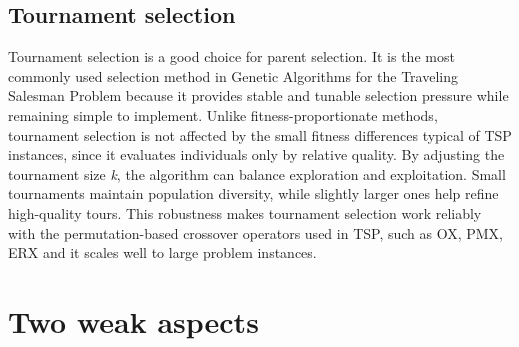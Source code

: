 \documentclass[a4paper,10pt]{article}
\newcommand{\ReplaceMe}[1]{{\color{blue}#1}}
\begin{document}

\subsection{Tournament selection}
Tournament selection is a good choice for parent selection. It is the most commonly used selection method in Genetic Algorithms for the Traveling Salesman Problem because it provides stable and tunable selection pressure while remaining simple to implement. Unlike fitness-proportionate methods, tournament selection is not affected by the small fitness differences typical of TSP instances, since it evaluates individuals only by relative quality. By adjusting the tournament size \textit{k}, the algorithm can balance exploration and exploitation. Small tournaments maintain population diversity, while slightly larger ones help refine high-quality tours. This robustness makes tournament selection work reliably with the permutation-based crossover operators used in TSP, such as OX, PMX, ERX and it scales well to large problem instances.

\section{Two weak aspects} 

\end{document}
